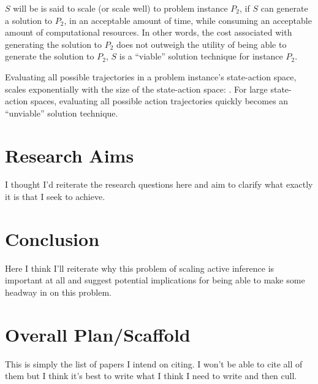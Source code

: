 \documentclass[12pt, oneside]{article}
\begin{document}
$S$ will be is said to scale (or scale well) to problem instance $P_2$, if $S$ can generate a solution to $P_2$, in an acceptable amount of time, while consuming an acceptable amount of computational resources. In other words, the cost associated with generating the solution to $P_2$ does not outweigh the utility of being able to generate the solution to $P_2$, $S$ is a ``viable'' solution technique for instance $P_2$. 

Evaluating all possible trajectories in a problem instance's state-action space, scales exponentially with the size of the state-action space: \textcite{Applications-of-FEP-Machine-Learning-Neuroscience}. For large state-action spaces, evaluating all possible action trajectories quickly becomes an ``unviable'' solution technique.

\section{Research Aims}

I thought I'd reiterate the research questions here and aim to clarify what exactly it is that I seek to achieve.

\section{Conclusion}

Here I think I'll reiterate why this problem of scaling active inference is important at all and suggest potential implications for being able to make some headway in on this problem. 


\section{Overall Plan/Scaffold}

This is simply the list of papers I intend on citing. I won't be able to cite all of them but I think it's best to write what I think I need to write and then cull.
\end{document}
